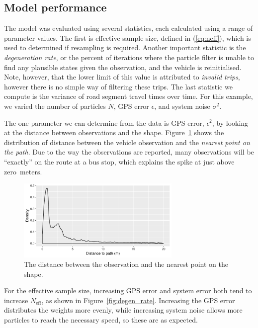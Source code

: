 \subsection{Model performance}
\label{sec:model_perf}


The model was evaluated using several statistics,
each calculated using a range of parameter values.
The first is effective sample size,
defined in (\ref{eq:neff}),
which is used to determined if resampling is required.
Another important statistic is the \emph{degeneration rate},
or the percent of iterations where the particle filter
is unable to find any plausible states given the observation,
and the vehicle is reinitialised.
Note, however, that the lower limit of this value 
is attributed to \emph{invalid trips},
however there is no simple way of filtering these trips.
The last statistic we compute is the variance of road segment travel times
over time.
For this example, we varied the number of particles $N$,
GPS error $\epsilon$, and system noise $\sigma^2$.


The one parameter we can determine from the data is GPS error, $\epsilon^2$,
by looking at the distance between observations and the shape.
Figure~\ref{fig:dist_to_route} shows the distribution of distance between the vehicle
observation and the \emph{nearest point on the path}.
Due to the way the observations are reported, 
many observations will be ``exactly'' on the route at a bus stop,
which explains the spike at just above zero~meters.

\begin{figure}[tb]
    \centering
    \includegraphics[width=0.7\textwidth]{figures/04_model_results_dist.pdf}
    \caption{The distance between the observation and the nearest point on the shape.}
    \label{fig:dist_to_route}
\end{figure}


For the effective sample size, 
increasing GPS error and system error both tend to
increase $N_\text{eff}$, as shown in Figure~\ref{fig:degen_rate}.
Increasing the GPS error distributes the weights more evenly,
while increasing system noise allows more particles to reach
the necessary speed,
so these are as expected.

